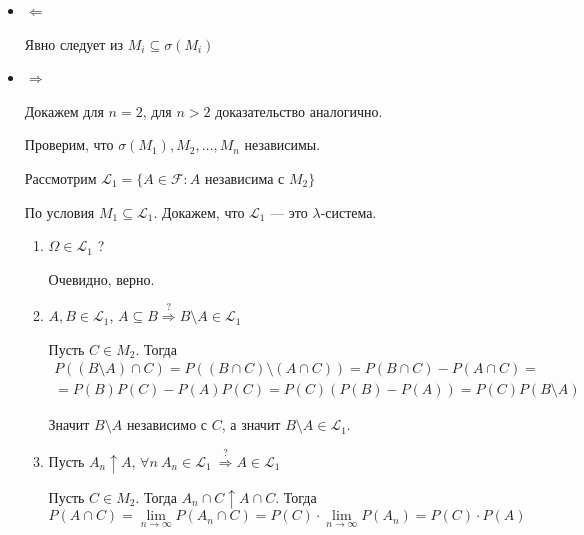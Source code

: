 \begin{itemize}
    \item
        \( \Leftarrow \)

        Явно следует из \( M_i \subseteq \sigma(M_i) \)
    \item
        \( \Rightarrow \)

        Докажем для \( n = 2 \),
        для \( n > 2 \) доказательство аналогично.

        Проверим, что \( \sigma(M_1), M_2, \ldots, M_n \) независимы.

        Рассмотрим \( \mathcal{L_1} = \{ A \in \mathcal{F} : A \text{ независима с } M_2 \} \)

        По условия \( M_1 \subseteq \mathcal{L}_1 \).
        Докажем, что \( \mathcal{L}_1 \) --- это \( \lambda \)-система.

        \begin{enumerate}
            \item
                \( \Omega \in \mathcal{L}_1 \) ?

                Очевидно, верно.
            \item
                \( A, B \in \mathcal{L}_1 \), \( A \subseteq B \overset{?}{\Rightarrow} B \setminus A \in \mathcal{L}_1 \)

                Пусть \( C \in M_2 \). Тогда
                \begin{gather*}
                    P ( ( B \setminus A ) \cap C )
                    =
                    P ( (B \cap C) \setminus (A \cap C) )
                    =
                    P( B \cap C ) - P( A \cap C )
                    =
                    \\
                    =
                    P(B) P(C) - P(A) P(C)
                    =
                    P(C) ( P(B) - P(A) )
                    =
                    P(C) P( B \setminus A )
                \end{gather*}

                Значит \( B \setminus A \) независимо с \( C \),
                а значит \( B \setminus A \in \mathcal{L}_1 \).
            \item
                Пусть \( A_n \uparrow A \), \( \forall n \ A_n \in \mathcal{L}_1 \ \overset{?}{\Rightarrow} A \in \mathcal{L_1} \)

                Пусть \( C \in M_2 \). Тогда \( A_n \cap C \uparrow A \cap C \). Тогда
                \[
                    P(A \cap C)
                    =
                    \lim\limits_{n \to \infty}
                    P(A_n \cap C)
                    =
                    P(C) \cdot \lim\limits_{n \to \infty} P(A_n)
                    =
                    P(C) \cdot P(A)
                \]


\end{enumerate}
\end{itemize}
